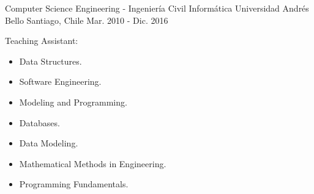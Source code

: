 

\begin{cventries}

  \cventry
    {Computer Science Engineering - Ingeniería Civil Informática} %
    {Universidad Andrés Bello} %
    {Santiago, Chile} %
    {Mar. 2010 - Dic. 2016} %
    {
     	\begin{cvitems} %
        	\item {Teaching Assistant:}
        		\begin{itemize}
        			\item {Data Structures.}
	        		\item {Software Engineering.}
        			\item {Modeling and Programming.}
        			\item {Databases.}
        			\item {Data Modeling.}
        			\item {Mathematical Methods in Engineering.}
        			\item {Programming Fundamentals.}
      		\end{itemize}
    	\end{cvitems}
    }
     

\end{cventries}
